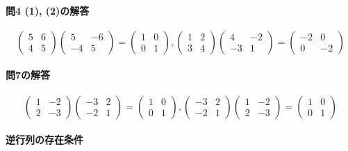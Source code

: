 \paragraph{問4 (1), (2)の解答}
\[
\begin{pmatrix}
5 & 6 \\
4 & 5
\end{pmatrix}
\begin{pmatrix}
5 & -6 \\
-4 & 5
\end{pmatrix}
=
\begin{pmatrix}
1 & 0 \\
0 & 1
\end{pmatrix}, 
\begin{pmatrix}
1 & 2 \\
3 & 4
\end{pmatrix}
\begin{pmatrix}
4 & -2 \\
-3 & 1
\end{pmatrix}
=
\begin{pmatrix}
-2 & 0 \\
0 & -2
\end{pmatrix}
\]

\paragraph{問7の解答}

\[
\begin{pmatrix}
1 & -2 \\
2 & -3
\end{pmatrix}
\begin{pmatrix}
-3 & 2 \\
-2 & 1
\end{pmatrix}
=
\begin{pmatrix}
1 & 0 \\
0 & 1
\end{pmatrix}, 
\begin{pmatrix}
-3 & 2 \\
-2 & 1
\end{pmatrix}
\begin{pmatrix}
1 & -2 \\
2 & -3
\end{pmatrix}
= 
\begin{pmatrix}
1 & 0 \\
0 & 1
\end{pmatrix}
\]

\paragraph{逆行列の存在条件} \label{paragraph:existence_of_inverse_matrix}

